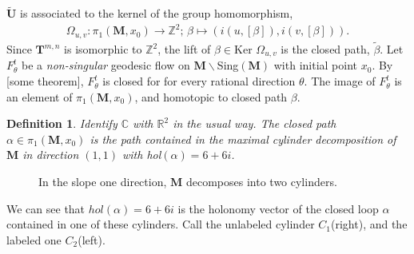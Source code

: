 \documentclass[]{article}
\newtheorem{Def}{Definition}[section]
\begin{document}
$\tilde{\mathbf{U}}$ is associated to the kernel of the group homomorphism,
\begin{align}
\Omega_{u,v}:\pi_1(\mathbf{M},x_0)\rightarrow \mathbb{Z}^2 \text{; } \beta\mapsto(i(u,[\beta]),i(v,[\beta])).
\end{align}
Since $\mathbf{T}^{m,n}$ is isomorphic to $\mathbb{Z}^2$, the lift of $\beta\in \text{Ker } \Omega_{u,v}$ is the closed path, $\tilde{\beta}$. Let $F^t_\theta$ be a \emph{non-singular} geodesic flow on $\mathbf{M}\backslash$Sing$(\mathbf M)$ with initial point $x_0$. By [some theorem], $F^t_\theta$ is closed for for every rational direction $\theta$. The image of $F^t_\theta$ is an element of $\pi_1(\mathbf M, x_0)$, and homotopic to closed path $\beta$. 

\begin{Def} Identify $\mathbb C$ with $\mathbb{R}^2$ in the usual way. The closed path $\alpha\in\pi_1(\mathbf M, x_0)$ is the path contained in the maximal cylinder decomposition of $\mathbf M$ in direction $(1,1)$ with hol$(\alpha)=6+6i$.
\end{Def}

\begin{figure}[H]
\centering

\caption{In the slope one direction, $\mathbf M$ decomposes into two cylinders.}
\end{figure}

We can see that $hol(\alpha)=6+6i$ is the holonomy vector of the closed loop $\alpha$ contained in one of these cylinders. Call the unlabeled cylinder $C_1$(right), and the labeled one $C_2$(left).
\end{document}
